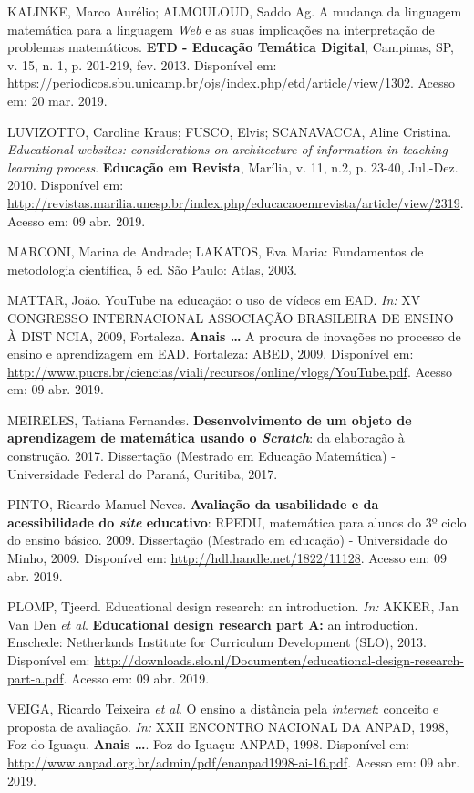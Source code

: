 \documentclass{IFNMG}
\begin{document}
\begin{Referencias}
	KALINKE, Marco Aurélio; ALMOULOUD, Saddo Ag. A mudança da linguagem matemática para a linguagem \textit{Web} e as suas implicações na interpretação de problemas matemáticos. \textbf{ETD - Educação Temática Digital}, Campinas, SP, v. 15, n. 1, p. 201-219, fev. 2013. Disponível em: \url{https://periodicos.sbu.unicamp.br/ojs/index.php/etd/article/view/1302}. Acesso em: 20 mar. 2019.
	
	LUVIZOTTO, Caroline Kraus; FUSCO, Elvis; SCANAVACCA, Aline Cristina. \textit{Educational websites: considerations on architecture of information in teaching-learning process}. \textbf{Educação em Revista}, Marília, v. 11, n.2, p. 23-40, Jul.-Dez. 2010. Disponível em: \url{http://revistas.marilia.unesp.br/index.php/educacaoemrevista/article/view/2319}. Acesso em: 09 abr. 2019.
	
	MARCONI, Marina de Andrade; LAKATOS, Eva Maria: Fundamentos de metodologia científica, 5 ed. São Paulo: Atlas, 2003.
	
	MATTAR, João.  YouTube na educação: o uso de vídeos em EAD. \textit{In:} XV CONGRESSO INTERNACIONAL ASSOCIAÇÃO BRASILEIRA DE ENSINO À DIST NCIA, 2009, Fortaleza. \textbf{Anais …} A procura de inovações no processo de ensino e aprendizagem em EAD. Fortaleza: ABED, 2009. Disponível em: \url{http://www.pucrs.br/ciencias/viali/recursos/online/vlogs/YouTube.pdf}. Acesso em: 09 abr. 2019.
	
	MEIRELES, Tatiana Fernandes. \textbf{Desenvolvimento de um objeto de aprendizagem de matemática usando o \textit{Scratch}}: da elaboração à construção. 2017. Dissertação (Mestrado em Educação Matemática) - Universidade Federal do Paraná, Curitiba, 2017.
	
	PINTO, Ricardo Manuel Neves. \textbf{Avaliação da usabilidade e da acessibilidade do \textit{site} educativo}: RPEDU, matemática para alunos do 3º ciclo do ensino básico. 2009. Dissertação (Mestrado em educação) - Universidade do Minho, 2009. Disponível em: \url{http://hdl.handle.net/1822/11128}. Acesso em: 09 abr. 2019.
	
	PLOMP, Tjeerd. Educational design research: an introduction. \textit{In:} AKKER, Jan Van Den \textit{et al}. \textbf{Educational design research part A:} an introduction. Enschede: Netherlands Institute for Curriculum Development (SLO), 2013. Disponível em: \url{http://downloads.slo.nl/Documenten/educational-design-research-part-a.pdf}. Acesso em: 09 abr. 2019.
	
	VEIGA, Ricardo Teixeira \textit{et al}. O ensino a distância pela \textit{internet}: conceito e proposta de avaliação. \textit{In:} XXII ENCONTRO NACIONAL DA ANPAD, 1998, Foz do Iguaçu. \textbf{Anais …}. Foz do Iguaçu: ANPAD, 1998. Disponível em: \url{http://www.anpad.org.br/admin/pdf/enanpad1998-ai-16.pdf}. Acesso em: 09 abr. 2019.	
	\end{Referencias}

%
\end{document}
